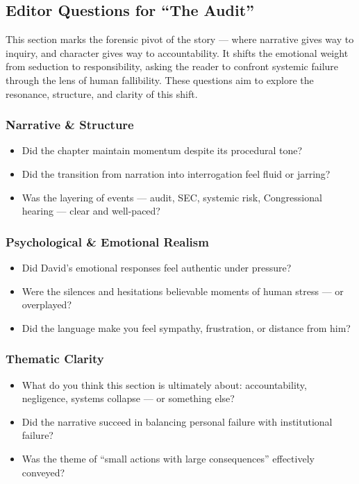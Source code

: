 \subsection{Editor Questions for ``The Audit''}

This section marks the forensic pivot of the story — where narrative gives way to inquiry, and character gives way to accountability. It shifts the emotional weight from seduction to responsibility, asking the reader to confront systemic failure through the lens of human fallibility. These questions aim to explore the resonance, structure, and clarity of this shift.

\subsubsection{Narrative \& Structure}

\begin{itemize}
  \item Did the chapter maintain momentum despite its procedural tone?
  \item Did the transition from narration into interrogation feel fluid or jarring?
  \item Was the layering of events — audit, SEC, systemic risk, Congressional hearing — clear and well-paced?
\end{itemize}

\subsubsection{Psychological \& Emotional Realism}

\begin{itemize}
  \item Did David's emotional responses feel authentic under pressure?
  \item Were the silences and hesitations believable moments of human stress — or overplayed?
  \item Did the language make you feel sympathy, frustration, or distance from him?
\end{itemize}

\subsubsection{Thematic Clarity}

\begin{itemize}
  \item What do you think this section is ultimately about: accountability, negligence, systems collapse — or something else?
  \item Did the narrative succeed in balancing personal failure with institutional failure?
  \item Was the theme of “small actions with large consequences” effectively conveyed?
\end{itemize}

